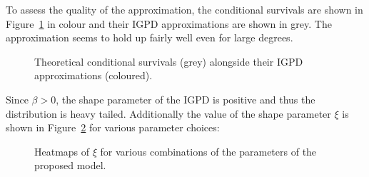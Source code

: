 \documentclass[
  sn-basic,
]{sn-jnl}
\theoremstyle{plain}
\theoremstyle{remark}
\begin{document}
To assess the quality of the approximation, the conditional survivals
are shown in Figure~\ref{fig-approx_surv} in colour and their IGPD
approximations are shown in grey. The approximation seems to hold up
fairly well even for large degrees.

\begin{figure}[H]


\caption{\label{fig-approx_surv}Theoretical conditional survivals (grey)
alongside their IGPD approximations (coloured).}

\end{figure}%

Since \(\beta>0\), the shape parameter of the IGPD is positive and thus
the distribution is heavy tailed. Additionally the value of the shape
parameter \(\xi\) is shown in Figure~\ref{fig-polyheat} for various
parameter choices:

\begin{figure}[H]


\caption{\label{fig-polyheat}Heatmaps of \(\xi\) for various
combinations of the parameters of the proposed model.}

\end{figure}%
\end{document}
